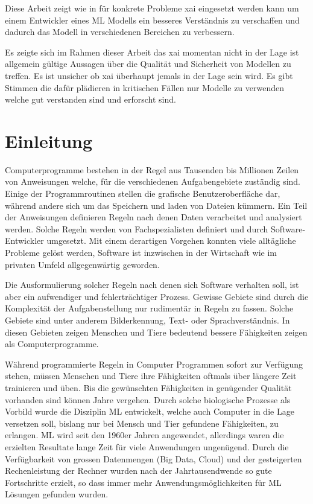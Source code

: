 \documentclass[
  12pt, %
  a4paper, %
  oneside, %
  openany, 
  numbers=noenddot, %
  BCOR=5mm, %
  parskip=half*, %
  thesis, %
]{bfhbook}
\begin{document}
Diese Arbeit zeigt wie in für konkrete Probleme \Gls{xai} eingesetzt werden kann um einem Entwickler eines \Gls{ML} Modells ein besseres Verständnis zu verschaffen und dadurch das Modell in verschiedenen Bereichen zu verbessern.

Es zeigte sich im Rahmen dieser Arbeit das \Gls{xai} momentan nicht in der Lage ist allgemein gültige Aussagen über die Qualität und Sicherheit von  Modellen zu treffen. Es ist unsicher ob \Gls{xai} überhaupt jemals in der Lage sein wird. Es gibt Stimmen die dafür plädieren in kritischen Fällen nur Modelle zu verwenden welche gut verstanden sind und erforscht sind.

\chapter{Einleitung}
Computerprogramme bestehen in der Regel aus Tausenden bis Millionen Zeilen von Anweisungen welche, für die verschiedenen Aufgabengebiete zuständig sind. Einige der Programmroutinen stellen die grafische Benutzeroberfläche dar, während andere sich um das Speichern und laden von Dateien kümmern. Ein Teil der Anweisungen definieren Regeln nach denen Daten verarbeitet und analysiert werden. Solche Regeln werden von Fachspezialisten definiert und durch Software-Entwickler umgesetzt. Mit einem derartigen Vorgehen konnten viele alltägliche Probleme gelöst werden, Software ist inzwischen in der Wirtschaft wie im privaten Umfeld allgegenwärtig geworden. 

Die Ausformulierung solcher Regeln nach denen sich Software verhalten soll, ist aber ein aufwendiger und fehlerträchtiger Prozess. Gewisse Gebiete sind durch die Komplexität der Aufgabenstellung nur rudimentär in Regeln zu fassen. Solche Gebiete sind unter anderem Bilderkennung, Text- oder Sprachverständnis. In diesen Gebieten zeigen Menschen und Tiere bedeutend bessere Fähigkeiten zeigen als Computerprogramme. 

Während programmierte Regeln in Computer Programmen sofort zur Verfügung stehen, müssen Menschen und Tiere ihre Fähigkeiten oftmals über längere Zeit trainieren und üben. Bis die gewünschten Fähigkeiten in genügender Qualität vorhanden sind können Jahre vergehen. Durch solche biologische Prozesse als Vorbild wurde die Disziplin \gls{ML} entwickelt, welche auch Computer in die Lage versetzen soll, bislang nur bei Mensch und Tier gefundene Fähigkeiten, zu erlangen.
\gls{ML} wird seit den 1960er Jahren angewendet, allerdings waren die erzielten Resultate lange Zeit für viele Anwendungen ungenügend. Durch die Verfügbarkeit von grossen Datenmengen (Big Data, Cloud) und der gesteigerten Rechenleistung der Rechner wurden nach der Jahrtausendwende so gute Fortschritte erzielt, so dass immer mehr Anwendungsmöglichkeiten für \gls{ML} Lösungen gefunden wurden. 
\end{document}
